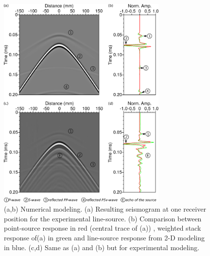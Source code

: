 \documentclass[manuscript,revised]{geophysics}
\newcommand{\twod}{2-D }
\begin{document}
\begin{figure}[!h]
	\centering
	\includegraphics[width=0.75\textwidth]{fig/amplitude_stack_principle.eps}
	\caption{(a,b) Numerical modeling. (a) Resulting seismogram at one receiver position for the experimental line-source. (b) Comparison between point-source response in red (central trace of (a)) , weighted stack response of(a) in green and line-source response from \twod modeling in blue. (c,d) Same as (a) and (b) but for experimental modeling.}
	\label{amplitude_stack_principle}
\end{figure}
\end{document}
